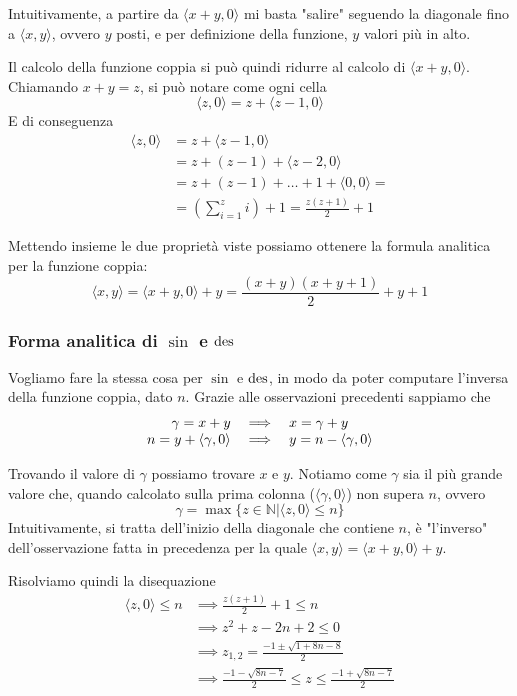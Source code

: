 Intuitivamente, a partire da $\langle x + y, 0\rangle$ mi basta "salire" seguendo la diagonale fino a $\langle x,y \rangle$, ovvero $y$ posti, e per definizione della funzione, $y$ valori più in alto.

Il calcolo della funzione coppia si può quindi ridurre al calcolo di $\langle x + y, 0 \rangle$. Chiamando $x + y = z$, si può notare come ogni cella
$$ \langle z,0 \rangle = z + \langle z - 1, 0 \rangle $$
E di conseguenza
\begin{align*}
	\langle z,0 \rangle & = z + \langle z - 1, 0 \rangle \\
	& = z + (z-1) + \langle z-2, 0 \rangle \\
	& = z + (z-1) + \dots + 1 + \langle 0,0 \rangle = \\
	& = \left( \sum_{i=1}^{z} i \right) + 1 = \frac{z(z+1)}{2} + 1
\end{align*}

Mettendo insieme le due proprietà viste possiamo ottenere la formula analitica per la funzione coppia: 
$$ \langle x,y \rangle = \langle x + y, 0 \rangle + y = \frac{(x + y) (x + y + 1)}{2} + y + 1 $$

\subsubsection{Forma analitica di $\sin$ e $\operatorname{des}$} 
Vogliamo fare la stessa cosa per $\sin$ e $\operatorname{des}$, in modo da poter computare l'inversa della funzione coppia, dato $n$. Grazie alle osservazioni precedenti sappiamo che
$$ \begin{array}{r c l}
	\gamma = x + y & \implies & x = \gamma + y \\
	n = y + \langle \gamma , 0 \rangle & \implies & y = n - \langle \gamma , 0 \rangle \\
\end{array} $$

Trovando il valore di $\gamma$ possiamo trovare $x$ e $y$. Notiamo come $\gamma$ sia il più grande valore che, quando calcolato sulla prima colonna ($\langle \gamma, 0 \rangle$) non supera $n$, ovvero
$$ \gamma = \max \{z \in \mathbb{N} | \langle z, 0 \rangle \leq n \} $$
Intuitivamente, si tratta dell'inizio della diagonale che contiene $n$, è "l'inverso" dell'osservazione fatta in precedenza per la quale $ \langle x,y \rangle = \langle x + y,0 \rangle + y $.

Risolviamo quindi la disequazione
\begin{align*}
	\langle z, 0 \rangle \leq n & \implies \frac{z(z+1)}{2} + 1 \leq n \\
	& \implies z^2 + z - 2n + 2 \leq 0 \\
	& \implies z_{1,2} = \frac{-1 \pm \sqrt{1 + 8n - 8}}{2} \\
	& \implies \frac{-1 - \sqrt{8n - 7}}{2} \leq z \leq \frac{-1 + \sqrt{8n - 7}}{2} 
\end{align*}

